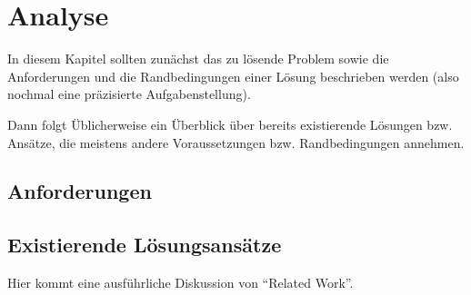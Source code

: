 
\chapter{Analyse}
\label{ch:Analyse}
In diesem Kapitel sollten zun{\"a}chst das zu l{\"o}sende Problem
sowie die Anforderungen und die Randbedingungen 
einer L{\"o}sung beschrieben werden (also nochmal
eine pr{\"a}zisierte Aufgabenstellung).

Dann folgt {\"U}blicherweise ein {\"U}berblick {\"u}ber bereits existierende
L{\"o}sungen bzw. Ans{\"a}tze, die meistens andere Voraussetzungen bzw.
Randbedingungen annehmen.


\section{Anforderungen}
\label{ch:Analyse:sec:Anforderungen}




\section{Existierende L{\"o}sungsans{\"a}tze}
\label{ch:Analyse:sec:RelatedWork}

Hier kommt eine ausf{\"u}hrliche Diskussion
von "`Related Work"'.






%


